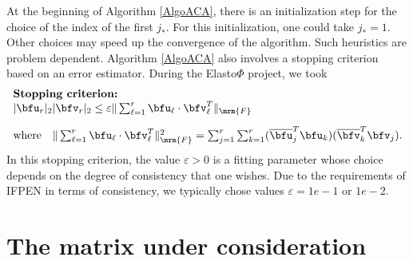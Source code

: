 \bigskip
At the beginning of Algorithm \ref{AlgoACA}, there is an initialization step for the choice of the index of the first $j_{*}$. 
For this initialization, one could take $j_{*} = 1$. Other choices may speed up the convergence of the algorithm. Such heuristics 
are problem dependent. Algorithm \ref{AlgoACA} also involves a stopping criterion based on an error estimator. During the Elasto$\Phi$ 
project, we took 
$$
\begin{array}{l}
\textbf{Stopping criterion:}\\ 
\vert \bfu_{r}\vert_{2}\vert \bfv_{r}\vert_{2}\leq  \varepsilon\Vert \sum_{\ell = 1}^{r}\bfu_{\ell}\cdot\bfv_{\ell}^{T}\Vert_{\mrm{F}}\\[10pt]
\textrm{where}\quad \Vert \sum_{\ell = 1}^{r}\bfu_{\ell}\cdot\bfv_{\ell}^{T}\Vert_{\mrm{F}}^{2} = \sum_{j=1}^{r}\sum_{k=1}^{r}
(\overline{\bfu}_{j}^{T}\bfu_{k})(\overline{\bfv}_{k}^{T}\bfv_{j}).
\end{array}
$$
In this stopping criterion, the value $\varepsilon>0$ is a fitting parameter whose choice depends on the degree of consistency 
that one wishes. Due to the requirements of IFPEN in terms of consistency, we typically chose values 
$\varepsilon = 1e-1$ or $1e-2$.





\section{The matrix under consideration}\label{sec:GalerkinMatrix}

